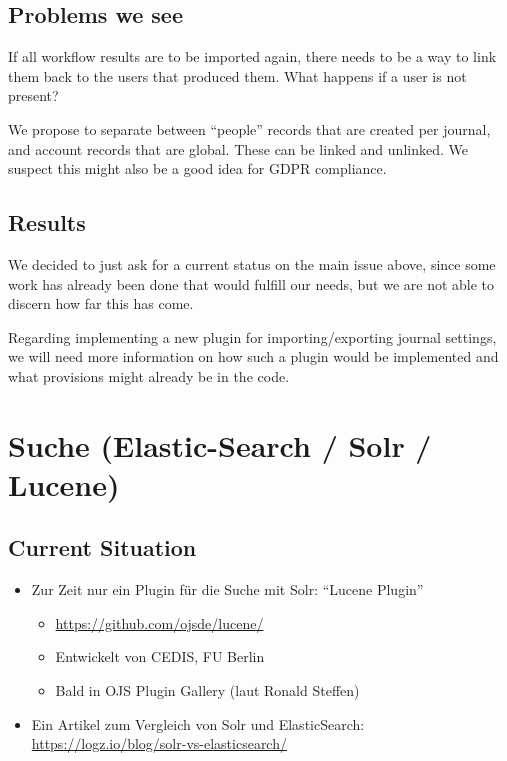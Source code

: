 \documentclass{article}
\begin{document}
\subsection[{Problems we see}]{\label{vfybgm5yfkwb}Problems we see}\par
If all workflow results are to be imported again, there needs to be a way to link them back to the users that produced them. What happens if a user is not present? \par
We propose to separate between “people” records that are created per journal, and account records that are global. These can be linked and unlinked. We suspect this might also be a good idea for GDPR compliance.
\subsection[{Results}]{\label{c4kqlfgcopb9}Results}\par
We decided to just ask for a current status on the main issue above, since some work has already been done that would fulfill our needs, but we are not able to discern how far this has come.\par
Regarding implementing a new plugin for importing/exporting journal settings, we will need more information on how such a plugin would be implemented and what provisions might already be in the code.\par
 
\section{Suche (Elastic-Search / Solr / Lucene)}

\author{Nils Weiher, Constanze Decker, Tom Niers}


\subsection[{Current Situation}]{\label{4aeirk1scnvf}Current Situation}

\begin{itemize}
\item Zur Zeit nur ein Plugin für die Suche mit Solr: “Lucene Plugin”

\begin{itemize}
\item \url{https://github.com/ojsde/lucene/}
\item Entwickelt von CEDIS, FU Berlin
\item Bald in OJS Plugin Gallery (laut Ronald Steffen) 
\end{itemize} 
\item Ein Artikel zum Vergleich von Solr und ElasticSearch: \url{https://logz.io/blog/solr-vs-elasticsearch/}
\end{itemize} 
\end{document}
